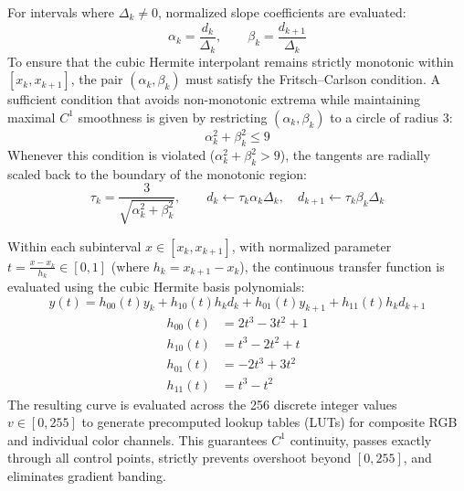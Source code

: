 \documentclass[10pt,journal,compsoc]{IEEEtran}
\begin{document}
For intervals where $\Delta_k \neq 0$, normalized slope coefficients are evaluated:
\begin{equation}
\alpha_k = \frac{d_k}{\Delta_k}, \qquad \beta_k = \frac{d_{k+1}}{\Delta_k}
\end{equation}
To ensure that the cubic Hermite interpolant remains strictly monotonic within $[x_k, x_{k+1}]$, the pair $(\alpha_k, \beta_k)$ must satisfy the Fritsch--Carlson condition. A sufficient condition that avoids non-monotonic extrema while maintaining maximal $C^1$ smoothness is given by restricting $(\alpha_k, \beta_k)$ to a circle of radius 3:
\begin{equation}
\alpha_k^2 + \beta_k^2 \le 9
\end{equation}
Whenever this condition is violated ($\alpha_k^2 + \beta_k^2 > 9$), the tangents are radially scaled back to the boundary of the monotonic region:
\begin{equation}
\tau_k = \frac{3}{\sqrt{\alpha_k^2 + \beta_k^2}}, \qquad d_k \leftarrow \tau_k \alpha_k \Delta_k, \quad d_{k+1} \leftarrow \tau_k \beta_k \Delta_k
\end{equation}

Within each subinterval $x \in [x_k, x_{k+1}]$, with normalized parameter $t = \frac{x - x_k}{h_k} \in [0, 1]$ (where $h_k = x_{k+1} - x_k$), the continuous transfer function is evaluated using the cubic Hermite basis polynomials:
\begin{equation}
y(t) = h_{00}(t) y_k + h_{10}(t) h_k d_k + h_{01}(t) y_{k+1} + h_{11}(t) h_k d_{k+1}
\end{equation}
\begin{align}
h_{00}(t) &= 2t^3 - 3t^2 + 1 \\
h_{10}(t) &= t^3 - 2t^2 + t \\
h_{01}(t) &= -2t^3 + 3t^2 \\
h_{11}(t) &= t^3 - t^2
\end{align}
The resulting curve is evaluated across the 256 discrete integer values $v \in [0, 255]$ to generate precomputed lookup tables (LUTs) for composite RGB and individual color channels. This guarantees $C^1$ continuity, passes exactly through all control points, strictly prevents overshoot beyond $[0, 255]$, and eliminates gradient banding.
\end{document}
